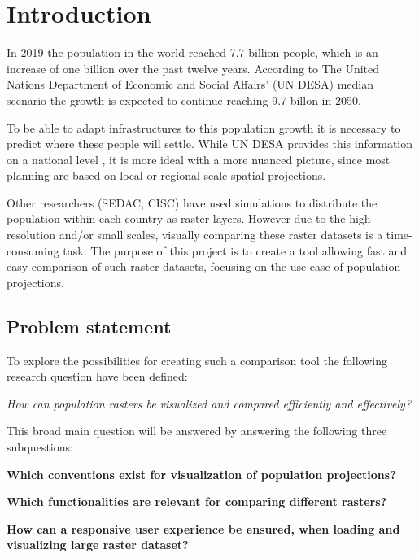 \chapter{Introduction}

In 2019 the population in the world reached 7.7 billion people, which is an increase of one billion over the past twelve years. According to The United Nations Department of Economic and Social Affairs’ (UN DESA) median scenario the growth is expected to continue reaching 9.7 billon in 2050. \citep{UNDEASHightlights} 

To be able to adapt infrastructures to this population growth it is necessary to predict where these people will settle. While UN DESA provides this information on a national level \citep{NationalPop}, it is more ideal with a more nuanced picture, since most planning are based on local or regional scale spatial projections. \citep{WhyDetailedPop}

Other researchers (SEDAC, CISC) have used simulations to distribute the population within each country as raster layers. However due to the high resolution and/or small scales, visually comparing these raster datasets is a time-consuming task. The purpose of this project is to create a tool allowing fast and easy comparison of such raster datasets, focusing on the use case of population projections.


\section{Problem statement}

To explore the possibilities for creating such a comparison tool the following research question have been defined:

\textit{How can population rasters be visualized and compared efficiently and effectively?}

This broad main question will be answered by answering the following three subquestions:

\textbf{Which conventions exist for visualization of population projections?}

\textbf{Which functionalities are relevant for comparing different rasters?}

\textbf{How can a responsive user experience be ensured, when loading and visualizing large raster dataset?}

